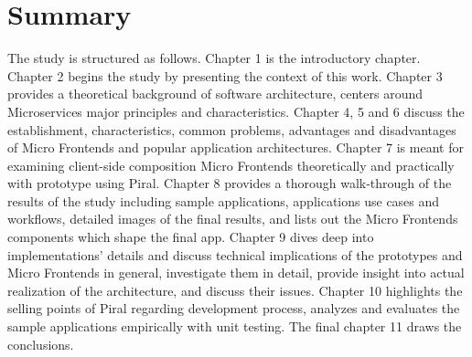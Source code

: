 \documentclass[a4paper]{book}
\begin{document}
\section{Summary}
The study is structured as follows. Chapter 1 is the introductory chapter. Chapter 2 begins the study by presenting the context of this work. Chapter 3 provides a theoretical background of software architecture, centers around Microservices major principles and characteristics. Chapter 4, 5 and 6 discuss the establishment, characteristics, common problems, advantages and disadvantages of Micro Frontends and popular application architectures. Chapter 7 is meant for examining client-side composition Micro Frontends theoretically and practically with prototype using Piral. Chapter 8 provides a thorough walk-through of the results of the study including sample applications, applications use cases and workflows, detailed images of the final results, and lists out the Micro Frontends components which shape the final app. Chapter 9 dives deep into implementations' details and discuss technical implications of the prototypes and Micro Frontends in general, investigate them in detail, provide insight into actual realization of the architecture, and discuss their issues. Chapter 10 highlights the selling points of Piral regarding development process, analyzes and evaluates the sample applications empirically with unit testing. The final chapter 11 draws the conclusions.
\end{document}
